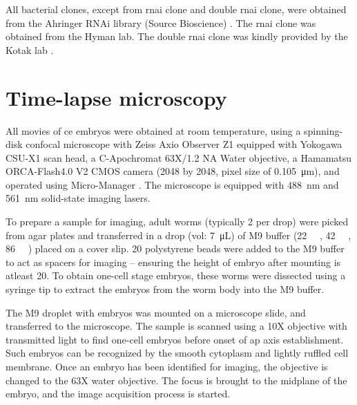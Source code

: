 All bacterial clones, except from  \ac{rnai} clone and  double \ac{rnai} clone, were obtained from the Ahringer RNAi library (Source Bioscience) \citep{kamath2003genome}. The  \ac{rnai} clone was obtained from the Hyman lab. The  double \ac{rnai} clone was kindly provided by the Kotak lab \citep{kapoor2019centrosome}.

\section{Time-lapse microscopy}\label{sec:microscope}
All movies of \ac{ce} embryos were obtained at room temperature, using a spinning-disk confocal microscope with Zeiss Axio Observer Z1 equipped with Yokogawa CSU-X1 scan head, a C-Apochromat 63X/1.2 NA Water objective, a Hamamatsu ORCA-Flash4.0 V2 CMOS camera (\SI{2048}{\pixels} by \SI{2048}{\pixels}, pixel size of \SI{0.105}{\micro\meter}), and operated using Micro-Manager \citep{edelstein2014advanced}. The microscope is equipped with \SI{488}{\nano\meter} and \SI{561}{\nano\meter} solid-state imaging lasers.

To prepare a sample for imaging, adult worms (typically \num{2} per drop) were picked from agar plates and transferred in a drop (vol: \SI{7}{\micro\liter}) of M9 buffer (\SI{22}{\milli\Molar} , \SI{42}{\milli\Molar} , \SI{86}{\milli\Molar} ) placed on a cover slip. \SI{20}{\unitLength} polystyrene beads were added to the M9 buffer to act as spacers for imaging -- ensuring the height of embryo after mounting is atleast \SI{20}{\unitLength}. To obtain one-cell stage embryos, these worms were dissected using a syringe tip to extract the embryos from the worm body into the M9 buffer. 

The M9 droplet with embryos was mounted on a microscope slide, and transferred to the microscope. The sample is scanned using a \num{10}X objective with transmitted light to find one-cell embryos before onset of \ac{ap} axis establishment. Such embryos can be recognized by the smooth cytoplasm and lightly ruffled cell membrane. Once an embryo has been identified for imaging, the objective is changed to the \num{63}X water objective. The focus is brought to the midplane of the embryo, and the image acquisition process is started.

